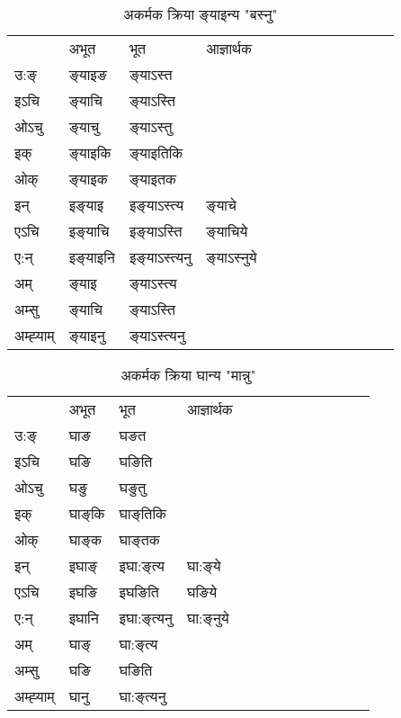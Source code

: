 \begin{table}[H]
\centering
\caption{\label{ɛn.vi} अकर्मक क्रिया  ङ्‌याइन्य  "बस्नु"  }
\begin{tabular}{l|l|l|l|l|l|l|l|l|l|l|l|l}  \toprule
&अभूत & भूत & आज्ञार्थक \\ 
उ:ङ्‌ &ङ्‌याइङ &ङ्‌याऽस्त \\ 
इऽचि &ङ्‌याचि &ङ्‌याऽस्ति   \\ 
ओऽचु &ङ्‌याचु &ङ्‌याऽस्तु   \\ 
इक् &ङ्‌याइकि &ङ्‌याइतिकि   \\ 
ओक् &ङ्‌याइक &ङ्‌याइतक   \\ 
इन् & इङ्‌याइ & इङ्‌याऽस्त्य &ङ्‌याचे  \\ 
एऽचि & इङ्‌याचि & इङ्‌याऽस्ति &ङ्‌याचिये    \\ 
ए:न् & इङ्‌याइनि  & इङ्‌याऽस्त्यनु &ङ्‌याऽस्‍नुये  \\ 
अम् & ङ्‌याइ & ङ्‌याऽस्त्य   \\ 
अम्सु & ङ्‌याचि & ङ्‌याऽस्ति   \\ 
अम्ह्‍याम् & ङ्‌याइनु  & ङ्‌याऽस्त्यनु \\ 
\bottomrule
\end{tabular}
\end{table}


\begin{table}[H]
\centering
\caption{\label{aŋ.vi} अकर्मक क्रिया  घान्य  "मान्नु"  }
\begin{tabular}{l|l|l|l|l|l|l|l|l|l|l|l|l}  \toprule
&अभूत & भूत & आज्ञार्थक \\ 
उ:ङ्‌ &घाङ &घङत \\ 
इऽचि &घङि &घङिति   \\ 
ओऽचु &घङु &घङुतु   \\ 
इक् &घाङ्‌कि &घाङ्‌तिकि   \\ 
ओक् &घाङ्‌क &घाङ्‌तक   \\ 
इन् & इघाङ्‌ & इघा:ङ्‌त्य &घा:ङ्‌ये  \\ 
एऽचि & इघङि & इघङिति &घङिये    \\ 
ए:न् & इघानि  & इघा:ङ्‌त्यनु &घा:ङ्‌नुये  \\ 
अम् & घाङ्‌ & घा:ङ्‌त्य   \\ 
अम्सु & घङि & घङिति   \\ 
अम्ह्‍याम् & घानु  & घा:ङ्‌त्यनु \\ 
\bottomrule
\end{tabular}
\end{table}


